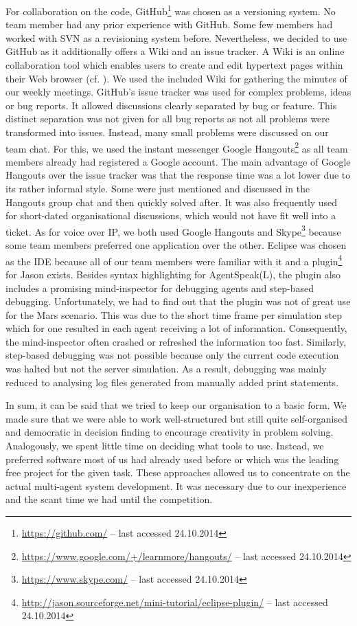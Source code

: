 For collaboration on the code, GitHub\footnote{\url{https://github.com/} -- last accessed 24.10.2014} was chosen as a versioning system. %
No team member had any prior experience with GitHub.
Some few members had worked with SVN as a revisioning system before.
Nevertheless, we decided to use GitHub as it additionally offers a Wiki and an issue tracker.
A Wiki is an online collaboration tool which enables users to create and edit hypertext pages within their Web browser (cf. \cite{leuf_wiki_2001}).
We used the included Wiki for gathering the minutes of our weekly meetings.
GitHub's issue tracker was used for complex problems, ideas or bug reports.
It allowed discussions clearly separated by bug or feature.
This distinct separation was not given for all bug reports as not all problems were transformed into issues.
Instead, many small problems were discussed on our team chat.
For this, we used the instant messenger Google Hangouts\footnote{\url{https://www.google.com/+/learnmore/hangouts/} -- last accessed 24.10.2014} as all team members already had registered a Google account. %
The main advantage of Google Hangouts over the issue tracker was that the response time was a lot lower due to its rather informal style.
Some were just mentioned and discussed in the Hangouts group chat and then quickly solved after.
It was also frequently used for short-dated organisational discussions, which would not have fit well into a ticket.
As for voice over IP, we both used Google Hangouts and Skype\footnote{\url{https://www.skype.com/} -- last accessed 24.10.2014} because some team members preferred one application over the other.
Eclipse was chosen as the IDE because all of our team members were familiar with it and a plugin\footnote{\url{http://jason.sourceforge.net/mini-tutorial/eclipse-plugin/} -- last accessed 24.10.2014} for Jason exists.
Besides syntax highlighting for AgentSpeak(L), the plugin also includes a promising mind-inspector for debugging agents and step-based debugging.
Unfortunately, we had to find out that the plugin was not of great use for the Mars scenario.
This was due to the short time frame per simulation step which for one resulted in each agent receiving a lot of information.
Consequently, the mind-inspector often crashed or refreshed the information too fast.
Similarly, step-based debugging was not possible because only the current code execution was halted but not the server simulation.
As a result, debugging was mainly reduced to analysing log files generated from manually added print statements.

In sum, it can be said that we tried to keep our organisation to a basic form.
We made sure that we were able to work well-structured but still quite self-organised and democratic in decision finding to encourage creativity in problem solving.
Analogously, we spent little time on deciding what tools to use.
Instead, we preferred software most of us had already used before or which was the leading free project for the given task.
These approaches allowed us to concentrate on the actual multi-agent system development.
It was necessary due to our inexperience and the scant time we had until the competition.
